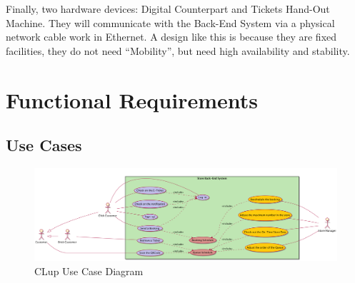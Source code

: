 \documentclass[a4paper,12pt]{report}
\begin{document}
Finally, two hardware devices: Digital Counterpart and Tickets Hand-Out Machine. They will communicate with the Back-End System via a physical network cable work in Ethernet. A design like this is because they are fixed facilities, they do not need “Mobility”, but need high availability and stability.


\section{Functional Requirements}
\subsection{Use Cases}

\begin{figure}
	\includegraphics[angle=90,scale=0.17]{usecase_diagram.png}
	\centering
	\caption{CLup Use Case Diagram}
	\label{Use Case}
\end{figure}
\end{document}
